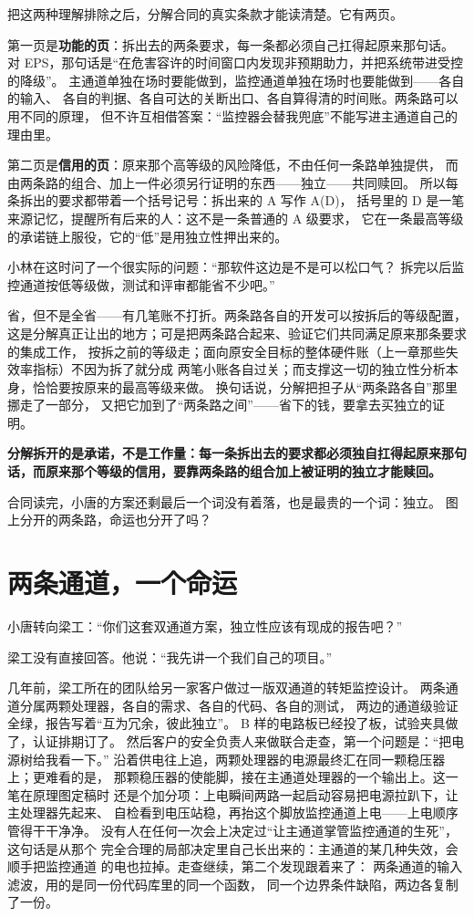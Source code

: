 把这两种理解排除之后，分解合同的真实条款才能读清楚。它有两页。

第一页是\textbf{功能的页}：拆出去的两条要求，每一条都必须自己扛得起原来那句话。
对 EPS，那句话是“在危害容许的时间窗口内发现非预期助力，并把系统带进受控的降级”。
主通道单独在场时要能做到，监控通道单独在场时也要能做到——各自的输入、
各自的判据、各自可达的关断出口、各自算得清的时间账。两条路可以用不同的原理，
但不许互相借答案：“监控器会替我兜底”不能写进主通道自己的理由里。

第二页是\textbf{信用的页}：原来那个高等级的风险降低，不由任何一条路单独提供，
而由两条路的组合、加上一件必须另行证明的东西——独立——共同赎回。
所以每条拆出的要求都带着一个括号记号：拆出来的 A 写作 A(D)，
括号里的 D 是一笔来源记忆，提醒所有后来的人：这不是一条普通的 A 级要求，
它在一条最高等级的承诺链上服役，它的“低”是用独立性押出来的。

小林在这时问了一个很实际的问题：“那软件这边是不是可以松口气？
拆完以后监控通道按低等级做，测试和评审都能省不少吧。”

省，但不是全省——有几笔账不打折。两条路各自的开发可以按拆后的等级配置，
这是分解真正让出的地方；可是把两条路合起来、验证它们共同满足原来那条要求的集成工作，
按拆之前的等级走；面向原安全目标的整体硬件账（上一章那些失效率指标）不因为拆了就分成
两笔小账各自过关；而支撑这一切的独立性分析本身，恰恰要按原来的最高等级来做。
换句话说，分解把担子从“两条路各自”那里挪走了一部分，
又把它加到了“两条路之间”——省下的钱，要拿去买独立的证明。

\textbf{分解拆开的是承诺，不是工作量：每一条拆出去的要求都必须独自扛得起原来那句话，而原来那个等级的信用，要靠两条路的组合加上被证明的独立才能赎回。}

合同读完，小唐的方案还剩最后一个词没有着落，也是最贵的一个词：独立。
图上分开的两条路，命运也分开了吗？

\section{两条通道，一个命运}

小唐转向梁工：“你们这套双通道方案，独立性应该有现成的报告吧？”

梁工没有直接回答。他说：“我先讲一个我们自己的项目。”

几年前，梁工所在的团队给另一家客户做过一版双通道的转矩监控设计。
两条通道分属两颗处理器，各自的需求、各自的代码、各自的测试，
两边的通道级验证全绿，报告写着“互为冗余，彼此独立”。
B 样的电路板已经投了板，试验夹具做了，认证排期订了。
然后客户的安全负责人来做联合走查，第一个问题是：“把电源树给我看一下。”
沿着供电往上追，两颗处理器的电源最终汇在同一颗稳压器上；更难看的是，
那颗稳压器的使能脚，接在主通道处理器的一个输出上。这一笔在原理图定稿时
还是个加分项：上电瞬间两路一起启动容易把电源拉趴下，让主处理器先起来、
自检看到电压站稳，再抬这个脚放监控通道上电——上电顺序管得干干净净。
没有人在任何一次会上决定过“让主通道掌管监控通道的生死”，这句话是从那个
完全合理的局部决定里自己长出来的：主通道的某几种失效，会顺手把监控通道
的电也拉掉。走查继续，第二个发现跟着来了：
两条通道的输入滤波，用的是同一份代码库里的同一个函数，
同一个边界条件缺陷，两边各复制了一份。

